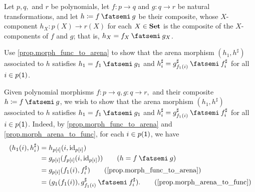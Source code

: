 \documentclass[Book-Poly]{subfiles}
\begin{document}
\begin{exercise}
Let $p,q,$ and $r$ be polynomials, let $f \colon p \to q$ and $g \colon q \to r$ be natural transformations, and let $h \coloneqq f \then g$ be their composite, whose $X$-component $h_X \colon p(X) \to r(X)$ for each $X \in \textbf{Set}$ is the composite of the $X$-components of $f$ and $g$; that is, $h_X = f_X \then g_X$.

Use \cref{prop.morph_func_to_arena} to show that the arena morphism $(h_1, h^\sharp)$ associated to $h$ satisfies $h_1 = f_1 \then g_1$ and $h^\sharp_i = g^\sharp_{f_1(i)} \then f^\sharp_i$ for all $i \in p(\textsf{1})$.
\begin{solution}
Given polynomial morphisms $f \colon p \to q, g \colon q \to r,$ and their composite $h \coloneqq f \then g$, we wish to show that the arena morphism $(h_1, h^\sharp)$ associated to $h$ satisfies $h_1 = f_1 \then g_1$ and $h^\sharp_i = g^\sharp_{f_1(i)} \then f^\sharp_i$ for all $i \in p(\textsf{1})$.
Indeed, by \cref{prop.morph_func_to_arena} and \cref{prop.morph_arena_to_func}, for each $i \in p(\textsf{1})$, we have
\begin{align*}
    (h_1(i), h^\sharp_i) &= h_{p[i]}(i, \id_{p[i]}) \\
    &= g_{p[i]}(f_{p[i]}(i, \id_{p[i]})) \tag{$h = f \then g$} \\
    &= g_{p[i]}(f_1(i), f^\sharp_i) \tag{\cref{prop.morph_func_to_arena}} \\
    &= (g_1(f_1(i)), g^\sharp_{f_1(i)} \then f^\sharp_i). \tag{\cref{prop.morph_arena_to_func}}
\end{align*}
\end{solution}
\end{exercise}


\end{document}
